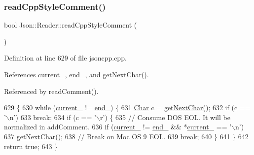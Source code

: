 \subsubsection{\texorpdfstring{read\+Cpp\+Style\+Comment()}{readCppStyleComment()}}
{\footnotesize\ttfamily bool Json\+::\+Reader\+::read\+Cpp\+Style\+Comment (\begin{DoxyParamCaption}{ }\end{DoxyParamCaption})\hspace{0.3cm}{\ttfamily [private]}}



Definition at line 629 of file jsoncpp.\+cpp.



References current\+\_\+, end\+\_\+, and get\+Next\+Char().



Referenced by read\+Comment().


\begin{DoxyCode}
629                                  \{
630   \textcolor{keywordflow}{while} (\hyperlink{class_json_1_1_reader_a2f2feb5201a26da7aa133d2f7434479b}{current\_} != \hyperlink{class_json_1_1_reader_a714793579cbf4ee7c5a7223d2c8d77c1}{end\_}) \{
631     \hyperlink{class_json_1_1_reader_a3eec9118f3e9a672ba8348c3a79d0f45}{Char} c = \hyperlink{class_json_1_1_reader_ab61eb61333cc9ec3afe785663a53ce90}{getNextChar}();
632     \textcolor{keywordflow}{if} (c == \textcolor{charliteral}{'\(\backslash\)n'})
633       \textcolor{keywordflow}{break};
634     \textcolor{keywordflow}{if} (c == \textcolor{charliteral}{'\(\backslash\)r'}) \{
635       \textcolor{comment}{// Consume DOS EOL. It will be normalized in addComment.}
636       \textcolor{keywordflow}{if} (\hyperlink{class_json_1_1_reader_a2f2feb5201a26da7aa133d2f7434479b}{current\_} != \hyperlink{class_json_1_1_reader_a714793579cbf4ee7c5a7223d2c8d77c1}{end\_} && *\hyperlink{class_json_1_1_reader_a2f2feb5201a26da7aa133d2f7434479b}{current\_} == \textcolor{charliteral}{'\(\backslash\)n'})
637         \hyperlink{class_json_1_1_reader_ab61eb61333cc9ec3afe785663a53ce90}{getNextChar}();
638       \textcolor{comment}{// Break on Moc OS 9 EOL.}
639       \textcolor{keywordflow}{break};
640     \}
641   \}
642   \textcolor{keywordflow}{return} \textcolor{keyword}{true};
643 \}
\end{DoxyCode}
\mbox{\label{class_json_1_1_reader_ae0ffe796abdc3c5851589ee500e28c79}} 
